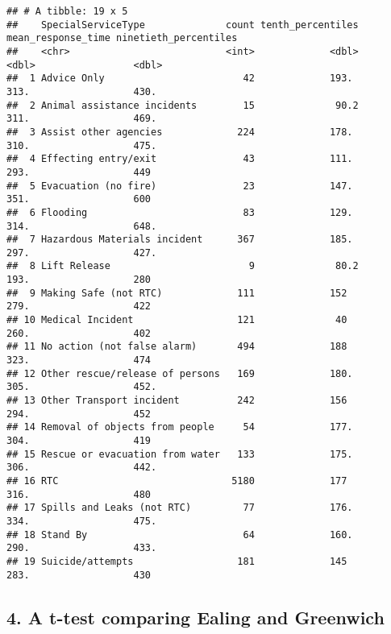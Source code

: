 \documentclass[
]{article}
\begin{document}
\begin{verbatim}
## # A tibble: 19 x 5
##    SpecialServiceType              count tenth_percentiles mean_response_time ninetieth_percentiles
##    <chr>                           <int>             <dbl>              <dbl>                 <dbl>
##  1 Advice Only                        42             193.                313.                  430.
##  2 Animal assistance incidents        15              90.2               311.                  469.
##  3 Assist other agencies             224             178.                310.                  475.
##  4 Effecting entry/exit               43             111.                293.                  449 
##  5 Evacuation (no fire)               23             147.                351.                  600 
##  6 Flooding                           83             129.                314.                  648.
##  7 Hazardous Materials incident      367             185.                297.                  427.
##  8 Lift Release                        9              80.2               193.                  280 
##  9 Making Safe (not RTC)             111             152                 279.                  422 
## 10 Medical Incident                  121              40                 260.                  402 
## 11 No action (not false alarm)       494             188                 323.                  474 
## 12 Other rescue/release of persons   169             180.                305.                  452.
## 13 Other Transport incident          242             156                 294.                  452 
## 14 Removal of objects from people     54             177.                304.                  419 
## 15 Rescue or evacuation from water   133             175.                306.                  442.
## 16 RTC                              5180             177                 316.                  480 
## 17 Spills and Leaks (not RTC)         77             176.                334.                  475.
## 18 Stand By                           64             160.                290.                  433.
## 19 Suicide/attempts                  181             145                 283.                  430
\end{verbatim}

\hypertarget{a-t-test-comparing-ealing-and-greenwich}{%
\subsection{4. A t-test comparing Ealing and
Greenwich}\label{a-t-test-comparing-ealing-and-greenwich}}
\end{document}
